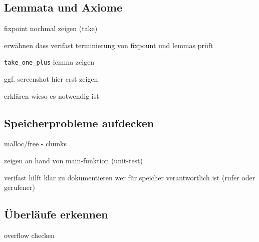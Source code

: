 \subsection{Lemmata und Axiome}

fixpoint nochmal zeigen (take)

erwähnen dass verifast terminierung von fixpount und lemmas prüft

\lstinline{take_one_plus} lemma zeigen

ggf. screenshot hier erst zeigen

erklären wieso es notwendig ist

\subsection{Speicherprobleme aufdecken}

malloc/free - chunks

zeigen an hand von main-funktion (unit-test)

verifast hilft klar zu dokumentieren wer für speicher verantwortlich ist (rufer oder gerufener)

\subsection{Überläufe erkennen}

overflow checken

